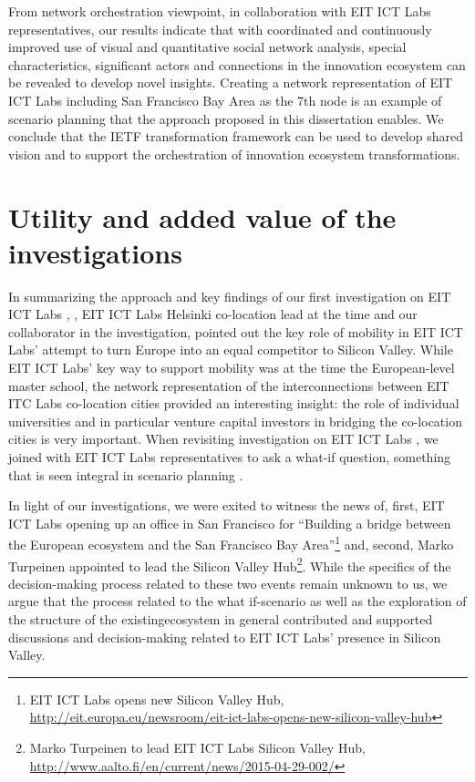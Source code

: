 From network orchestration viewpoint, in collaboration with EIT ICT Labs representatives, our results indicate that with coordinated and continuously improved use of visual and quantitative social network analysis, special characteristics, significant actors and connections in the innovation ecosystem can be revealed to develop novel insights. Creating a network representation of EIT ICT Labs including San Francisco Bay Area as the 7th node is an example of scenario planning that the approach proposed in this dissertation enables. We conclude that the IETF transformation framework can be used to develop shared vision and to support the orchestration of innovation ecosystem transformations.

\section{Utility and added value of the investigations}

In summarizing the approach and key findings of our first investigation on EIT ICT Labs \citep{Still2011ExplainingEurope}, \cite{Turpeinen2011}, EIT ICT Labs Helsinki co-location lead at the time and our collaborator in the investigation, pointed out the key role of mobility in EIT ICT Labs' attempt to turn Europe into an equal competitor to Silicon Valley. While EIT ICT Labs' key way to support mobility was at the time the European-level master school, the network representation of the interconnections between EIT ITC Labs co-location cities provided an interesting insight: the role of individual universities and in particular venture capital investors in bridging the co-location cities is very important. When revisiting investigation on EIT ICT Labs \citep{Still2012ParadigmDigital, Still2014InsightsVisualisations}, we joined with EIT ICT Labs representatives to ask a what-if question, something that is seen integral in scenario planning \citep{Schoemaker1995ScenarioThinking}.

In light of our investigations, we were exited to witness the news of, first, EIT ICT Labs opening up an office in San Francisco for ``Building a bridge between the European ecosystem and the San Francisco Bay Area''\footnote{EIT ICT Labs opens new Silicon Valley Hub, \url{http://eit.europa.eu/newsroom/eit-ict-labs-opens-new-silicon-valley-hub}} and, second, Marko Turpeinen appointed to lead the Silicon Valley Hub\footnote{Marko Turpeinen to lead EIT ICT Labs Silicon Valley Hub,  \url{http://www.aalto.fi/en/current/news/2015-04-29-002/}}. While the specifics of the decision-making process related to these two events remain unknown to us, we argue that the process related to the what if-scenario as well as the exploration of the structure of the existingecosystem in general contributed and supported discussions and decision-making related to  EIT ICT Labs' presence in Silicon Valley.


